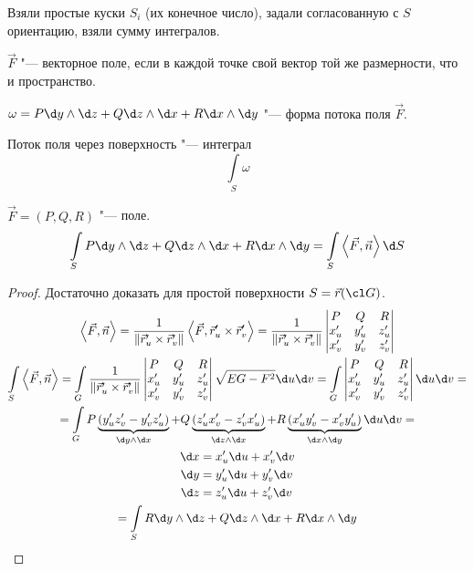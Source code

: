 \begin{Def}
	Взяли простые куски $S_i$ (их конечное число), задали согласованную с $S$ ориентацию, взяли сумму интегралов.
\end{Def}

\begin{Def}
	$\vec F$ "--- векторное поле, если в каждой точке свой вектор той же размерности, что и пространство.
\end{Def}

\begin{Def}
	$\omega = P \d y \wedge \d z + Q \d z \wedge \d x + R \d x \wedge \d y$ "--- форма потока поля $\vec F$.
\end{Def}

\begin{Def}
	Поток поля через поверхность "--- интеграл
	\[ \int\limits_S \omega \]
\end{Def}

\begin{theorem}
	$\vec F = (P, Q, R)$ "--- поле.
	\[ \int\limits_S P \d y \wedge \d z + Q \d z \wedge \d x + R \d x \wedge \d y = \int\limits_S \left<\vec F, \vec n\right> \d S \]
\end{theorem}
\begin{proof}
	Достаточно доказать для простой поверхности $S = \vec r(\cl G)$.
	\begin{gather*}
		\left<\vec F, \vec n\right>
		= \frac1{\|\vec r_u' \times \vec r_v'\|} \left<\vec F, \vec r_u' \times \vec r_v'\right>
		= \frac1{\|\vec r_u' \times \vec r_v'\|} \begin{vmatrix} P & Q & R \\ x_u' & y_u' & z_u' \\ x_v' & y_v' & z_v' \end{vmatrix} \\
		\int\limits_S \left<\vec F, \vec n\right>
		= \int\limits_G \frac1{\|\vec r_u' \times \vec r_v'\|} \begin{vmatrix} P & Q & R \\ x_u' & y_u' & z_u' \\ x_v' & y_v' & z_v' \end{vmatrix} \sqrt{EG-F^2} \d u \d v
		= \int\limits_G \begin{vmatrix} P & Q & R \\ x_u' & y_u' & z_u' \\ x_v' & y_v' & z_v' \end{vmatrix} \d u \d v = \\
		= \int\limits_G P\underbrace{(y_u' z_v' - y_v' z_u')}_{\d y \wedge \d x} + Q\underbrace{(z_u' x_v' - z_v' x_u')}_{\d z \wedge \d x} + R\underbrace{(x_u' y_v' - x_v' y_u')}_{\d x \wedge \d y} \d u \d v = \\
		\begin{aligned}
			\d x &= x_u' \d u + x_v' \d v \\
			\d y &= y_u' \d u + y_v' \d v \\
			\d z &= z_u' \d u + z_v' \d v
		\end{aligned} \\
		= \int\limits_S R \d y \wedge \d z + Q \d z \wedge \d x + R \d x \wedge \d y
	\end{gather*}
\end{proof}
